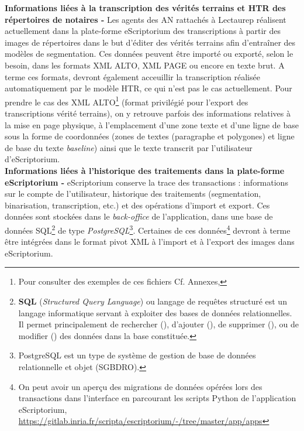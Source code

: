 \textbf{Informations liées à la transcription des vérités terrains et HTR des répertoires de notaires -} 
Les agents des AN rattachés à Lectaurep réalisent actuellement dans la plate-forme eScriptorium des 
transcriptions à partir des images de répertoires dans le but d'éditer des vérités terrains afin d'entraîner des modèles de segmentation. Ces données peuvent être importé ou exporté, selon le besoin, dans les formats XML ALTO, XML PAGE ou encore en texte brut. A terme ces formats, devront également acceuillir la transcription réalisée automatiquement par le modèle HTR, ce qui n'est pas le cas actuellement. Pour prendre le cas des XML ALTO\footnote{Pour consulter des exemples de ces fichiers Cf. Annexes, } (format privilégié pour l'export des transcriptions vérité terrains), on y retrouve parfois des informations relatives à la mise en page physique, à l'emplacement d'une zone texte et d'une ligne de base sous la forme de coordonnées (zones de textes (paragraphe et polygones) et ligne de base du texte \textit{baseline}) ainsi que le texte transcrit par l'utilisateur d'eScriptorium.\\

\textbf{Informations liées à l'historique des traitements dans la plate-forme eScriptorium -} eScriptorium conserve la trace des transactions  : informations sur le compte de l'utilisateur, historique des traitements (segmentation, binarisation, transcription, etc.) et des opérations d'import et export. Ces données sont stockées dans le \textit{back-office} de l'application, dans une base de données SQL\footnote{\textbf{SQL} (\textit{Structured Query Language}) ou langage de requêtes structuré est un langage informatique servant à exploiter des bases de données relationnelles. Il permet principalement de rechercher (), d'ajouter (), de supprimer (), ou de modifier () des données dans la base constituée.} de type \textit{PostgreSQL}\footnote{PostgreSQL est un type de système de gestion de base de données relationnelle et objet (SGBDRO).}. Certaines de ces données\footnote{On peut avoir un aperçu des migrations de données opérées lors des transactions dans l'interface en parcourant les scripts Python de l'application eScriptorium, \url{https://gitlab.inria.fr/scripta/escriptorium/-/tree/master/app/apps}} devront à terme  être intégrées dans le format pivot XML à l'import et à l'export des images dans eScriptorium.\\

